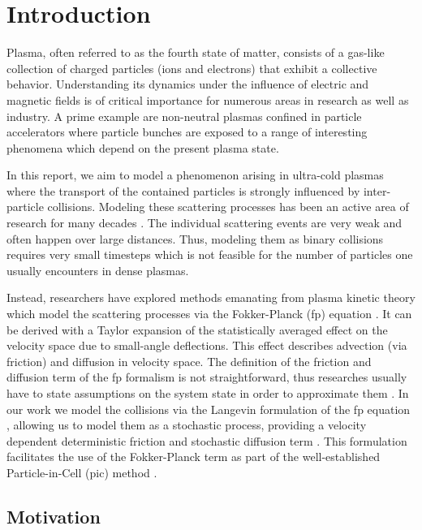 \chapter{Introduction}
\label{chapter:introduction}

Plasma, often referred to as the fourth state of matter, consists of a gas-like collection of
charged particles (ions and electrons) that exhibit a collective behavior.
Understanding its dynamics under the influence of electric and magnetic fields is of critical
importance for numerous areas in research as well as industry.
A prime example are non-neutral plasmas confined in particle accelerators where particle bunches are exposed to
a range of interesting phenomena which depend on the present plasma state.

In this report, we aim to model a phenomenon arising in ultra-cold plasmas where the transport of
the contained particles is strongly influenced by inter-particle collisions.
Modeling these scattering processes has been an active area of research for many decades
\cite{piwinski1974intra,kubo2001intrabeam}.
The individual scattering events are very weak and often happen over large distances.
Thus, modeling them as binary collisions requires very small timesteps which is not feasible for the
number of particles one usually encounters in dense plasmas.

Instead, researchers have explored methods emanating from plasma kinetic theory which model the scattering
processes via the Fokker-Planck (\gls{fp}) equation \cite{chandrasekhar1943,rosenbluth}.
It can be derived with a Taylor expansion of the statistically averaged effect on the velocity space due to
small-angle deflections. This effect describes advection (via friction) and diffusion in velocity space.
The definition of the friction and diffusion term of the \gls{fp} formalism is not straightforward, thus
researches usually have to state assumptions on the system state in order to approximate them
\cite{manheimer1997langevin,cadjan_ivanov_1999,jonesLangevin_1996}.
In our work we model the collisions via the Langevin formulation of the \gls{fp} equation \cite{cadjan_ivanov_1999}, allowing us to
model them as a stochastic process, providing a velocity dependent
deterministic friction and stochastic diffusion term \cite{stoel}.
This formulation facilitates the use of the Fokker-Planck term as part of the well-established
Particle-in-Cell (\gls{pic}) method \cite{bunemanPIC, dawsonPIC}.

\section{Motivation}


